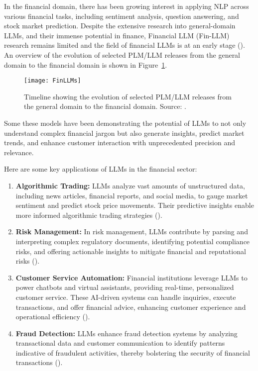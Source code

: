 In the financial domain, there has been growing interest in applying NLP across various financial tasks, including sentiment analysis, question answering, and stock market prediction.
Despite the extensive research into general-domain LLMs, and their immense potential in finance, Financial LLM (Fin-LLM) research remains limited and the field of financial LLMs is at an early stage (\textcite{lee2024survey}).
An overview of the evolution of selected PLM/LLM releases from the general domain to the financial domain is shown in Figure~\ref{fig:llm-finance}.

\begin{figure}[h]
	\centering
	\texttt{[image: FinLLMs]}
	\caption{Timeline showing the evolution of selected PLM/LLM releases from the general domain to the financial domain. Source: \protect\textcite{lee2024survey}.}
	\label{fig:llm-finance}
\end{figure}

Some these models have been demonstrating the potential of LLMs to not only understand complex financial jargon but also generate insights, predict market trends, and enhance customer interaction with unprecedented precision and relevance.

Here are some key applications of LLMs in the financial sector:

\begin{enumerate}
	\item \textbf{Algorithmic Trading:}
	      {LLMs analyze vast amounts of unstructured data, including news articles, financial reports, and social media, to gauge market sentiment and predict stock price movements.
		      Their predictive insights enable more informed algorithmic trading strategies (\textcite{buehler2018deep}).}

	\item \textbf{Risk Management:}
	      {In risk management, LLMs contribute by parsing and interpreting complex regulatory documents, identifying potential compliance risks, and offering actionable insights to mitigate financial and reputational risks (\textcite{li2020natural}).}

	\item \textbf{Customer Service Automation:}
	      {Financial institutions leverage LLMs to power chatbots and virtual assistants, providing real-time, personalized customer service. These AI-driven systems can handle inquiries, execute transactions, and offer financial advice, enhancing customer experience and operational efficiency (\textcite{pal2021enhancing}).}

	\item \textbf{Fraud Detection:}
	      {LLMs enhance fraud detection systems by analyzing transactional data and customer communication to identify patterns indicative of fraudulent activities, thereby bolstering the security of financial transactions (\textcite{smith2019improving}).}
\end{enumerate}

